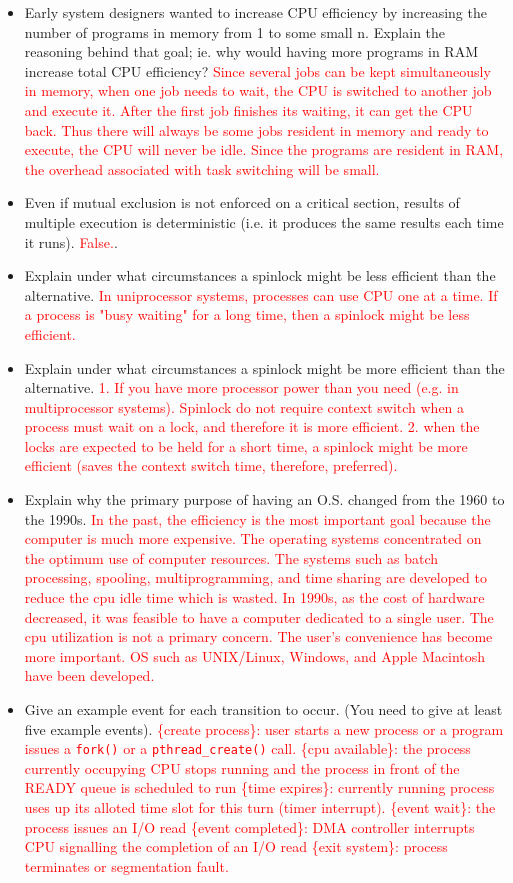 \documentclass[10pt,landscape]{article}
\newcommand{\answer}[1]{\textcolor{red}{#1}}
\begin{document}
\begin{multicols}{4}
\begin{itemize}
    \item Early system designers wanted to increase CPU efficiency by increasing the number of programs in memory from 1 to some small n.  Explain the reasoning behind that goal; ie. why would having more programs in RAM increase total CPU efficiency?  \answer{Since several jobs can be kept simultaneously in memory, when one job needs to wait, the CPU is switched to another job and execute it. After the first job finishes its waiting, it can get the CPU back. Thus there will always be some jobs resident in memory and ready to execute, the CPU will never be idle. Since the programs are resident in RAM, the overhead associated with task switching will be small.}
    \item Even if mutual exclusion is not enforced on a critical section, results of multiple execution is deterministic (i.e. it produces the same results each time it runs). \answer{False.}.
    \item Explain under what circumstances a spinlock might be less efficient than the alternative.  \answer{In uniprocessor systems, processes can use CPU one at a time.  If a process is "busy waiting" for a long time, then a spinlock might be less efficient.}
    \item Explain under what circumstances a spinlock might be more efficient than the alternative.  \answer{1. If you have more processor power than you need (e.g. in multiprocessor systems). Spinlock do not require context switch when a process must wait on a lock, and therefore it is more efficient.  2. when the locks are expected to be held for a short time, a spinlock might be more efficient (saves the context switch time, therefore, preferred).}
    \item Explain why the primary purpose of having an O.S. changed from the 1960 to the 1990s.  \answer{In the past, the efficiency is the most important goal because the computer is much more expensive. The operating systems concentrated on the optimum use of computer resources. The systems such as batch processing, spooling, multiprogramming, and time sharing are developed to reduce the cpu idle time which is wasted. In 1990s, as the cost of hardware decreased, it was feasible to have a computer dedicated to a single user. The cpu utilization is not a primary concern. The user's convenience has become more important. OS such as UNIX/Linux, Windows, and Apple Macintosh have been developed.}
    \item Give an example event for each transition to occur. (You need to give at least five example events). \answer{\{create process\}: user starts a new process or a program issues a \texttt{fork()} or a \texttt{pthread\_create()} call. \{cpu available\}: the process currently occupying CPU stops running and the process in front of the READY queue is scheduled to run \{time expires\}: currently running process uses up its alloted time slot for this turn (timer interrupt). \{event wait\}: the process issues an I/O read \{event completed\}: DMA controller interrupts CPU signalling the completion of an I/O read \{exit system\}: process terminates or segmentation fault.}


\end{itemize}
\end{multicols}
\end{document}
